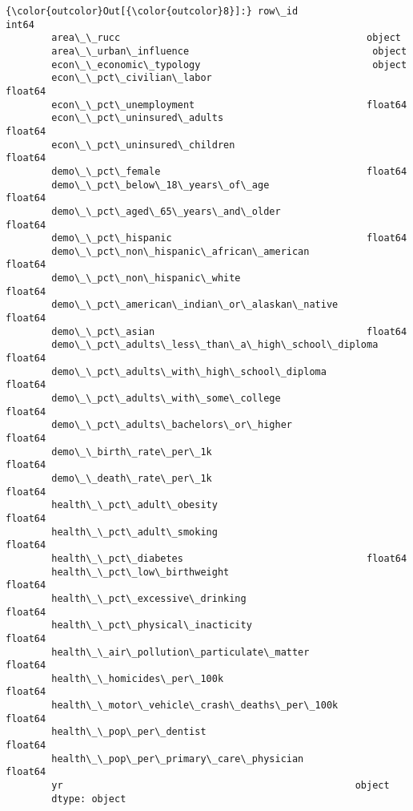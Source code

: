 \documentclass[11pt]{article}
\begin{document}
\begin{Verbatim}[commandchars=\\\{\}]
{\color{outcolor}Out[{\color{outcolor}8}]:} row\_id                                                int64
        area\_\_rucc                                           object
        area\_\_urban\_influence                                object
        econ\_\_economic\_typology                              object
        econ\_\_pct\_civilian\_labor                            float64
        econ\_\_pct\_unemployment                              float64
        econ\_\_pct\_uninsured\_adults                          float64
        econ\_\_pct\_uninsured\_children                        float64
        demo\_\_pct\_female                                    float64
        demo\_\_pct\_below\_18\_years\_of\_age                     float64
        demo\_\_pct\_aged\_65\_years\_and\_older                   float64
        demo\_\_pct\_hispanic                                  float64
        demo\_\_pct\_non\_hispanic\_african\_american             float64
        demo\_\_pct\_non\_hispanic\_white                        float64
        demo\_\_pct\_american\_indian\_or\_alaskan\_native         float64
        demo\_\_pct\_asian                                     float64
        demo\_\_pct\_adults\_less\_than\_a\_high\_school\_diploma    float64
        demo\_\_pct\_adults\_with\_high\_school\_diploma           float64
        demo\_\_pct\_adults\_with\_some\_college                  float64
        demo\_\_pct\_adults\_bachelors\_or\_higher                float64
        demo\_\_birth\_rate\_per\_1k                             float64
        demo\_\_death\_rate\_per\_1k                             float64
        health\_\_pct\_adult\_obesity                           float64
        health\_\_pct\_adult\_smoking                           float64
        health\_\_pct\_diabetes                                float64
        health\_\_pct\_low\_birthweight                         float64
        health\_\_pct\_excessive\_drinking                      float64
        health\_\_pct\_physical\_inacticity                     float64
        health\_\_air\_pollution\_particulate\_matter            float64
        health\_\_homicides\_per\_100k                          float64
        health\_\_motor\_vehicle\_crash\_deaths\_per\_100k         float64
        health\_\_pop\_per\_dentist                             float64
        health\_\_pop\_per\_primary\_care\_physician              float64
        yr                                                   object
        dtype: object
\end{Verbatim}
            
\end{document}
